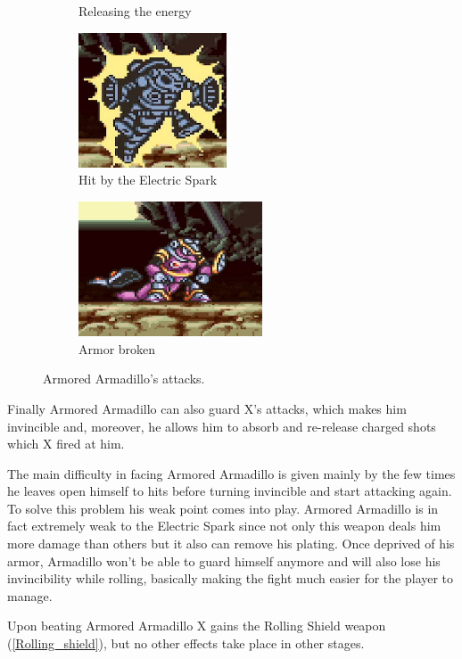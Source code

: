 \begin{figure}[htp]
\begin{subfigure}{0.45\textwidth}
		\caption{Releasing the energy}
	\end{subfigure}
	\begin{subfigure}{0.45\textwidth}
		\centering
		\includegraphics[height=4cm]{figures/X1/Armored_armadillo/Armadillo_shock_1.jpg}
		\caption{Hit by the Electric Spark}
	\end{subfigure}
	\begin{subfigure}{0.45\textwidth}
		\centering
		\includegraphics[height=4cm]{figures/X1/Armored_armadillo/Armadillo_shock_2.jpg}
		\caption{Armor broken}
	\end{subfigure}
	\caption{Armored Armadillo's attacks.}
\end{figure}
Finally Armored Armadillo can also guard X's attacks, which makes him invincible and, moreover, he allows him to absorb and re-release charged shots which X fired at him.  

The main difficulty in facing Armored Armadillo is given mainly by the few times he leaves open himself to hits before turning invincible and start attacking again. To solve this problem his weak point comes into play. Armored Armadillo is in fact extremely weak to the Electric Spark since not only this weapon deals him more damage than others but it also can remove his plating. Once deprived of his armor, Armadillo won't be able to guard himself anymore and will also lose his invincibility while rolling, basically making the fight much easier for the player to manage.

Upon beating Armored Armadillo X gains the Rolling Shield weapon (\ref{Rolling_shield}), but no other effects take place in other stages.

